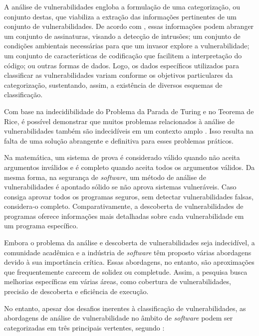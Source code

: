     A análise de vulnerabilidades engloba a formulação de uma categorização, ou conjunto destas, que viabiliza a extração das informações pertinentes de um conjunto de vulnerabilidades. De acordo com , essas informações podem abranger um conjunto de assinaturas, visando a detecção de intrusões; um conjunto de condições ambientais necessárias para que um invasor explore a vulnerabilidade; um conjunto de características de codificação que facilitem a interpretação do código; ou outras formas de dados. Logo, os dados específicos utilizados para classificar as vulnerabilidades variam conforme os objetivos particulares da categorização, sustentando, assim, a existência de diversos esquemas de classificação.

    Com base na indecidibilidade do Problema da Parada de Turing e no Teorema de Rice, é possível demonstrar que muitos problemas relacionados à análise de vulnerabilidades também são indecidíveis em um contexto amplo \cite{ghaffarian2017}. Isso resulta na falta de uma solução abrangente e definitiva para esses problemas práticos.

    Na matemática, um sistema de prova é considerado válido quando não aceita argumentos inválidos e é completo quando aceita todos os argumentos válidos. Da mesma forma, na segurança de \textit{software}, um método de análise de vulnerabilidades é apontado sólido se não aprova sistemas vulneráveis. Caso consiga aprovar todos os programas seguros, sem detectar vulnerabilidades falsas, considera-o completo. Comparativamente, a descoberta de vulnerabilidades de programas oferece informações mais detalhadas sobre cada vulnerabilidade em um programa específico.

    Embora o problema da análise e descoberta de vulnerabilidades seja indecidível, a comunidade acadêmica e a indústria de \textit{software} têm proposto várias abordagens devido à sua importância crítica. Essas abordagens, no entanto, são aproximações que frequentemente carecem de solidez ou completude. Assim, a pesquisa busca melhorias específicas em várias áreas, como cobertura de vulnerabilidades, precisão de descoberta e eficiência de execução.

    No entanto, apesar dos desafios inerentes à classificação de vulnerabilidades, as abordagens de análise de vulnerabilidade no âmbito de \textit{software} podem ser categorizadas em três principais vertentes, segundo :

